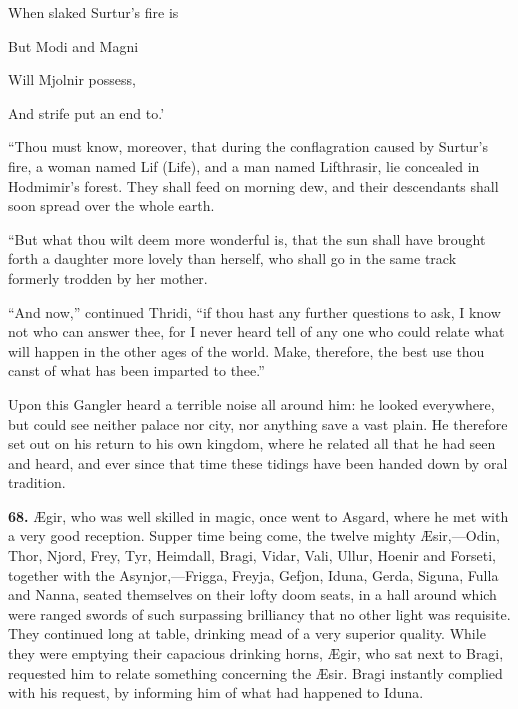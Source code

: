 When slaked Surtur's fire is

But Modi and Magni

Will Mjolnir possess,

And strife put an end to.'

``Thou must know, moreover, that during the conflagration caused by
Surtur's fire, a woman named Lif (Life), and a man named Lifthrasir,
lie concealed in Hodmimir's forest. They shall feed on morning dew,
and their descendants shall soon spread over the whole earth.

``But what thou wilt deem more wonderful is, that the sun shall have
brought forth a daughter more lovely than herself, who shall go in the
same track formerly trodden by her mother.

``And now,'' continued Thridi, ``if thou hast any further questions to
ask, I know not who can answer thee, for I never heard tell of any
one who could relate what will happen in the other ages of the world.
Make, therefore, the best use thou canst of what has been imparted to
thee.''

Upon this Gangler heard a terrible noise all around him: he looked
everywhere, but could see neither palace nor city, nor anything save a
vast plain. He therefore set out on his return to his own kingdom,
where he related all that he had seen and heard, and ever since that
time these tidings have been handed down by oral tradition.


\textbf{68.} Ægir, who was well skilled in magic, once went to Asgard, where
he met with a very good reception. Supper time being come, the twelve
mighty Æsir,—Odin, Thor, Njord, Frey, Tyr, Heimdall, Bragi, Vidar,
Vali, Ullur, Hoenir and Forseti, together with the Asynjor,—Frigga,
Freyja, Gefjon, Iduna, Gerda, Siguna, Fulla and Nanna, seated
themselves on their lofty doom seats, in a hall around which were
ranged swords of such surpassing brilliancy that no other light was
requisite. They continued long at table, drinking mead of a very
superior quality. While they were emptying their capacious drinking
horns, Ægir, who sat next to Bragi, requested him to relate something
concerning the Æsir. Bragi instantly complied with his request, by
informing him of what had happened to Iduna.



